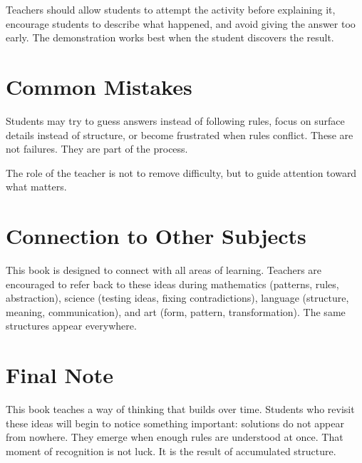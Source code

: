 \documentclass[12pt]{book}
\begin{document}
Teachers should allow students to attempt the activity before explaining
it, encourage students to describe what happened, and avoid giving the
answer too early. The demonstration works best when the student discovers
the result.

\section*{Common Mistakes}

Students may try to guess answers instead of following rules, focus on
surface details instead of structure, or become frustrated when rules
conflict. These are not failures. They are part of the process.

The role of the teacher is not to remove difficulty, but to guide
attention toward what matters.

\section*{Connection to Other Subjects}

This book is designed to connect with all areas of learning. Teachers are
encouraged to refer back to these ideas during mathematics (patterns,
rules, abstraction), science (testing ideas, fixing contradictions),
language (structure, meaning, communication), and art (form, pattern,
transformation). The same structures appear everywhere.

\section*{Final Note}

This book teaches a way of thinking that builds over time. Students who
revisit these ideas will begin to notice something important: solutions do
not appear from nowhere. They emerge when enough rules are understood at
once. That moment of recognition is not luck. It is the result of accumulated
structure.
\end{document}
